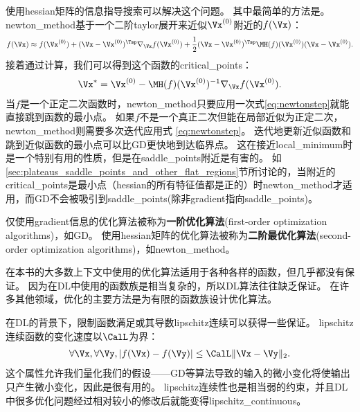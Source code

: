 
使用\gls{hessian}矩阵的信息指导搜索可以解决这个问题。
其中最简单的方法是。
\gls{newton_method}基于一个二阶\gls{taylor}展开来近似$\Vx^{(0)}$附近的$f(\Vx)$：
\begin{align}
 f(\Vx) \approx f(\Vx^{(0)}) + (\Vx - \Vx^{(0)})^\Tsp \nabla_{\Vx} f(\Vx^{(0)}) + 
 \frac{1}{2}  (\Vx - \Vx^{(0)})^\Tsp \MH(f)(\Vx^{(0)})  (\Vx - \Vx^{(0)}).
\end{align}
接着通过计算，我们可以得到这个函数的\gls{critical_points}：
\begin{align} \label{eq:newtonstep}
 \Vx^* =  \Vx^{(0)} -  \MH(f)(\Vx^{(0)})^{-1}  \nabla_{\Vx} f(\Vx^{(0)}) .
\end{align}
当$f$是一个正定二次函数时，\gls{newton_method}只要应用一次式\ref{eq:newtonstep}就能直接跳到函数的最小点。
如果$f$不是一个真正二次但能在局部近似为正定二次，\gls{newton_method}则需要多次迭代应用式 \ref{eq:newtonstep}。
迭代地更新近似函数和跳到近似函数的最小点可以比\gls{GD}更快地到达临界点。
这在接近\gls{local_minimum}时是一个特别有用的性质，但是在\gls{saddle_points}附近是有害的。
如\ref{sec:plateaus_saddle_points_and_other_flat_regions}节所讨论的，当附近的\gls{critical_points}是最小点（\gls{hessian}的所有特征值都是正的）时\gls{newton_method}才适用，而\gls{GD}不会被吸引到\gls{saddle_points}(除非\gls{gradient}指向\gls{saddle_points})。

仅使用\gls{gradient}信息的优化算法被称为\textbf{一阶优化算法}(first-order optimization algorithms)，如\gls{GD}。
使用\gls{hessian}矩阵的优化算法被称为\textbf{二阶最优化算法}(second-order optimization algorithms)\citep{NumOptBook}，如\gls{newton_method}。

在本书的大多数上下文中使用的优化算法适用于各种各样的函数，但几乎都没有保证。
因为在\gls{DL}中使用的函数族是相当复杂的，所以\gls{DL}算法往往缺乏保证。
在许多其他领域，优化的主要方法是为有限的函数族设计优化算法。

在\gls{DL}的背景下，限制函数满足或其导数\gls{lipschitz}连续可以获得一些保证。
\gls{lipschitz}连续函数的变化速度以$\CalL$为界：
\begin{align}
 \forall \Vx, \forall \Vy, | f(\Vx) - f(\Vy)|  \leq \CalL \| \Vx - \Vy \|_2 .
\end{align}
这个属性允许我们量化我们的假设——\gls{GD}等算法导致的输入的微小变化将使输出只产生微小变化，因此是很有用的。
\gls{lipschitz}连续性也是相当弱的约束，并且\gls{DL}中很多优化问题经过相对较小的修改后就能变得\gls{lipschitz_continuous}。

